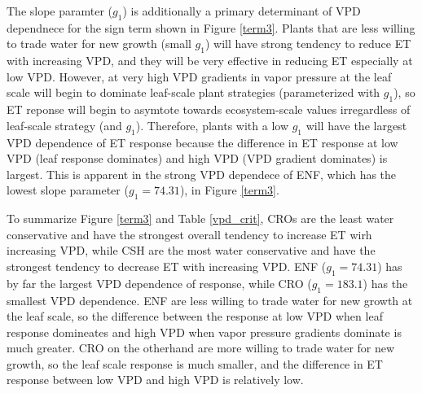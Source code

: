 \documentclass[draft,linenumbers]{agujournal}
\begin{document}
The slope paramter ($g_1$) is additionally a primary determinant of VPD  dependnece for the sign term shown in Figure \ref{term3}. Plants that are less willing to trade water for new growth (small $g_1$) will have strong tendency to reduce ET with increasing VPD, and they will be very effective in reducing ET especially at low VPD.  However, at very high VPD gradients in vapor pressure at the leaf scale will begin to dominate leaf-scale plant strategies (parameterized with $g_1$), so ET reponse will begin to asymtote towards ecosystem-scale values irregardless of leaf-scale strategy (and $g_1$). Therefore, plants with a low $g_1$ will have the largest VPD dependence of ET response because the difference in ET response at low VPD (leaf response dominates) and high VPD (VPD gradient dominates) is largest. This is apparent in the strong VPD dependece of ENF, which has the lowest slope parameter ($g_1=74.31$), in Figure \ref{term3}.  

To summarize Figure \ref{term3} and Table \ref{vpd_crit}, CROs are the least water conservative and have the strongest overall tendency to increase ET wirh increasing VPD, while CSH are the most water conservative and have the strongest tendency to decrease ET with increasing VPD.  ENF ($g_1 = 74.31$) has by far the largest VPD dependence of response, while CRO ($g_1 = 183.1$) has the smallest VPD dependence.  ENF are less willing to trade water for new growth at the leaf scale, so the difference between the response at low VPD when leaf response domineates and high VPD when vapor pressure gradients dominate is much greater. CRO on the otherhand are more willing to trade water for new growth, so the leaf scale response is much smaller, and the difference in ET response between low VPD and high VPD is relatively low.
\end{document}
